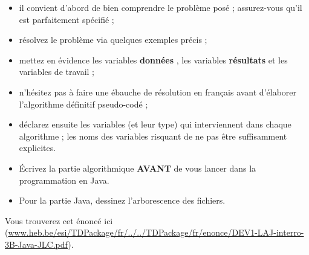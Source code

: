 \documentclass[11pt,a4paper]{article}
\begin{document}
					\begin{itemize}
				
			\item il convient d'abord de bien comprendre le probl\`eme pos\'e ; assurez-vous qu'il est parfaitement sp\'ecifi\'e ;
			\item r\'esolvez le probl\`eme via quelques exemples pr\'ecis ;
			\item mettez en \'evidence les variables \textbf{\guillemotleft  donn\'ees \guillemotright }, les variables \textbf{\guillemotleft  r\'esultats \guillemotright } et les variables de travail ;
			\item n'h\'esitez pas \`a faire une \'ebauche de r\'esolution en fran\c cais avant d'\'elaborer l'algorithme d\'efinitif pseudo-cod\'e ;
			\item d\'eclarez ensuite les variables (et leur type) qui interviennent dans chaque algorithme ; les noms des variables risquant de ne pas \^etre suffisamment explicites.
			\item \'Ecrivez la partie algorithmique \textbf{AVANT} de vous lancer dans la programmation en Java.
			\item Pour la partie Java, dessinez l'arborescence des fichiers. 
					\end{itemize}
				
            \par
        
          Vous trouverez cet \'enonc\'e ici (\url{www.heb.be/esi/TDPackage/fr/../../TDPackage/fr/enonce/DEV1-LAJ-interro-3B-Java-JLC.pdf}).
        
            \par
        
				
\end{document}
